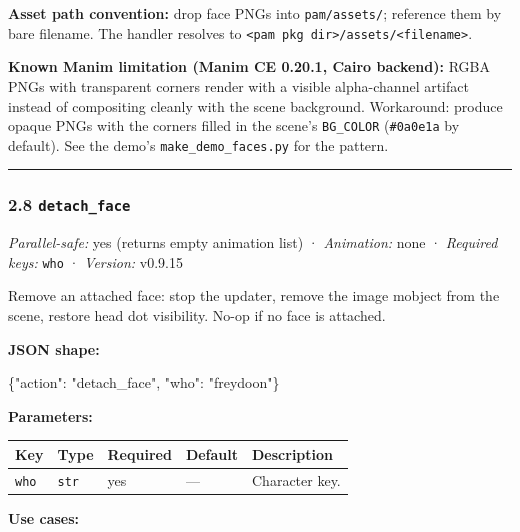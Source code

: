 \documentclass[
  11pt,
]{book}
\newenvironment{Shaded}{}{}
\newcommand{\DataTypeTok}[1]{\textcolor[rgb]{0.56,0.13,0.00}{#1}}
\newcommand{\FunctionTok}[1]{\textcolor[rgb]{0.02,0.16,0.49}{#1}}
\newcommand{\StringTok}[1]{\textcolor[rgb]{0.25,0.44,0.63}{#1}}
\begin{document}
\textbf{Asset path convention:} drop face PNGs into
\texttt{pam/assets/}; reference them by bare filename. The handler
resolves to
\texttt{\textless{}pam\ pkg\ dir\textgreater{}/assets/\textless{}filename\textgreater{}}.

\textbf{Known Manim limitation (Manim CE 0.20.1, Cairo backend):} RGBA
PNGs with transparent corners render with a visible alpha-channel
artifact instead of compositing cleanly with the scene background.
Workaround: produce opaque PNGs with the corners filled in the scene's
\texttt{BG\_COLOR} (\texttt{\#0a0e1a} by default). See the demo's
\texttt{make\_demo\_faces.py} for the pattern.

\begin{center}\rule{0.5\linewidth}{0.5pt}\end{center}

\subsubsection{\texorpdfstring{2.8
\texttt{detach\_face}}{2.8 detach\_face}}\label{detach_face}

\emph{Parallel-safe:} yes (returns empty animation list) ·
\emph{Animation:} none · \emph{Required keys:} \texttt{who} ·
\emph{Version:} v0.9.15

Remove an attached face: stop the updater, remove the image mobject from
the scene, restore head dot visibility. No-op if no face is attached.

\textbf{JSON shape:}

\begin{Shaded}
\begin{Highlighting}[]
\FunctionTok{\{}\DataTypeTok{"action"}\FunctionTok{:} \StringTok{"detach\_face"}\FunctionTok{,} \DataTypeTok{"who"}\FunctionTok{:} \StringTok{"freydoon"}\FunctionTok{\}}
\end{Highlighting}
\end{Shaded}

\textbf{Parameters:}

\begin{longtable}[]{@{}lllll@{}}
\toprule\noalign{}
Key & Type & Required & Default & Description \\
\midrule\noalign{}
\endhead
\bottomrule\noalign{}
\endlastfoot
\texttt{who} & \texttt{str} & yes & --- & Character key. \\
\end{longtable}

\textbf{Use cases:}
\end{document}
